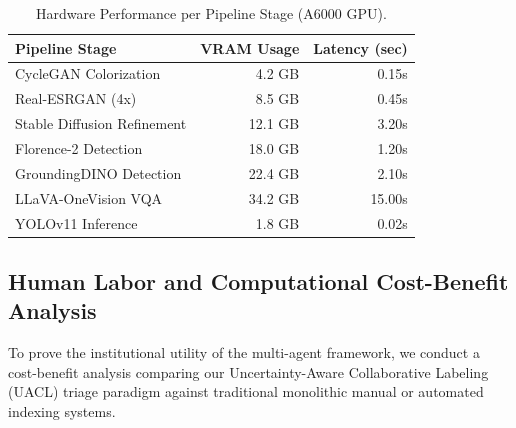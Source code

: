 \documentclass[12pt,onecolumn,a4paper]{IEEEtran}
\begin{document}
\begin{table}[!htbp]
\centering
\caption{Hardware Performance per Pipeline Stage (A6000 GPU).}
\label{tab:hardware_benchmarks}
\begin{tabular}{lrr}
\toprule
Pipeline Stage & VRAM Usage & Latency (sec) \\
\midrule
CycleGAN Colorization & 4.2 GB & 0.15s \\
Real-ESRGAN (4x) & 8.5 GB & 0.45s \\
Stable Diffusion Refinement & 12.1 GB & 3.20s \\
Florence-2 Detection & 18.0 GB & 1.20s \\
GroundingDINO Detection & 22.4 GB & 2.10s \\
LLaVA-OneVision VQA & 34.2 GB & 15.00s \\
YOLOv11 Inference & 1.8 GB & 0.02s \\
\bottomrule
\end{tabular}
\end{table}

\subsection{Human Labor and Computational Cost-Benefit Analysis}
To prove the institutional utility of the multi-agent framework, we conduct a cost-benefit analysis comparing our Uncertainty-Aware Collaborative Labeling (UACL) triage paradigm against traditional monolithic manual or automated indexing systems.
\end{document}
